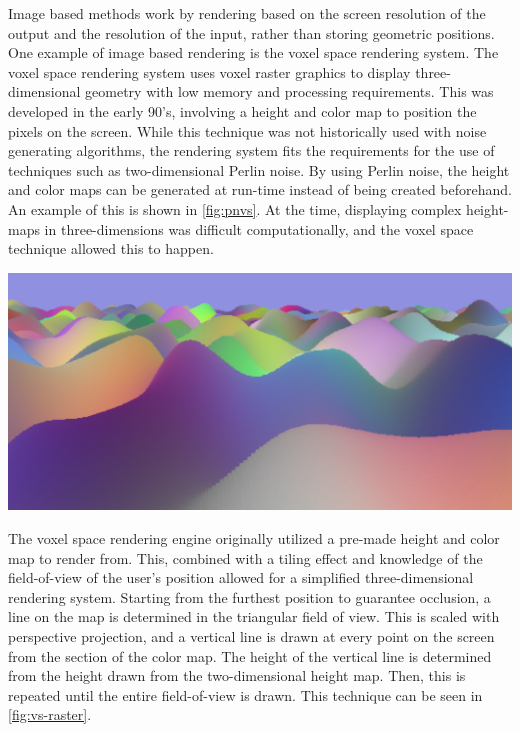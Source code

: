 \documentclass[10pt]{report}
\begin{document}
		Image based methods work by rendering based on the screen resolution of the output and the resolution of the input, rather than storing geometric positions. One example of image based rendering is the voxel space rendering system. The voxel space rendering system uses voxel raster graphics to display three-dimensional geometry with low memory and processing requirements. This was developed in the early 90's, involving a height and color map to position the pixels on the screen. While this technique was not historically used with noise generating algorithms, the rendering system fits the requirements for the use of techniques such as two-dimensional Perlin noise. By using Perlin noise, the height and color maps can be generated at run-time instead of being created beforehand. An example of this is shown in \autoref{fig:pnvs}. At the time, displaying complex height-maps in three-dimensions was difficult computationally, and the voxel space technique allowed this to happen.
		
		\begin{minipage}{\textwidth}
			\centering
			\includegraphics[scale=.15]{proc-voxel}
			\label{fig:pnvs}
		\end{minipage}
		
		The voxel space rendering engine originally utilized a pre-made height and color map to render from. This, combined with a tiling effect and knowledge of the field-of-view of the user's position allowed for a simplified three-dimensional rendering system. Starting from the furthest position to guarantee occlusion, a line on the map is determined in the triangular field of view. This is scaled with perspective projection, and a vertical line is drawn at every point on the screen from the section of the color map. The height of the vertical line is determined from the height drawn from the two-dimensional height map. Then, this is repeated until the entire field-of-view is drawn. This technique can be seen in \autoref{fig:vs-raster}. 
		
\end{document}
